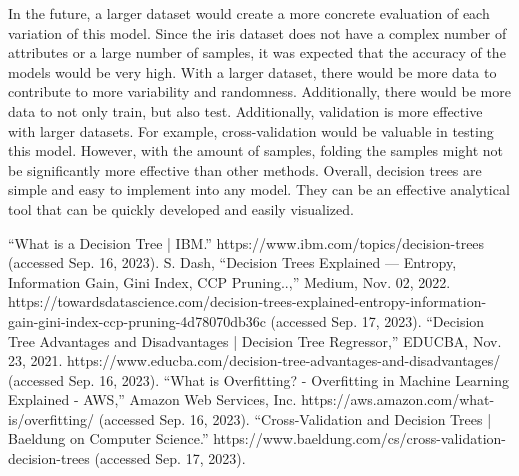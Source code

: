 \documentclass[journal]{IEEEtran}
\begin{document}
In the future, a larger dataset would create a more concrete evaluation of each variation of this model. Since the iris dataset does not have a complex number of attributes or a large number of  samples, it was expected that the accuracy of the models would be very high. With a larger dataset, there would be more data to contribute to more variability and randomness. Additionally, there would be more data to not only train, but also test. Additionally, validation is more effective with larger datasets. For example, cross-validation \cite{b5} would be valuable in testing this model. However, with the amount of samples, folding the samples might not be significantly more effective than other methods. Overall, decision trees are simple and easy to implement into any model. They can be an effective analytical tool that can be quickly developed and easily visualized. 


\begin{thebibliography}{00}
“What is a Decision Tree | IBM.” https://www.ibm.com/topics/decision-trees (accessed Sep. 16, 2023).
S. Dash, “Decision Trees Explained — Entropy, Information Gain, Gini Index, CCP Pruning..,” Medium, Nov. 02, 2022. https://towardsdatascience.com/decision-trees-explained-entropy-information-gain-gini-index-ccp-pruning-4d78070db36c (accessed Sep. 17, 2023).
“Decision Tree Advantages and Disadvantages | Decision Tree Regressor,” EDUCBA, Nov. 23, 2021. https://www.educba.com/decision-tree-advantages-and-disadvantages/ (accessed Sep. 16, 2023).
 “What is Overfitting? - Overfitting in Machine Learning Explained - AWS,” Amazon Web Services, Inc. https://aws.amazon.com/what-is/overfitting/ (accessed Sep. 16, 2023).
 “Cross-Validation and Decision Trees | Baeldung on Computer Science.” https://www.baeldung.com/cs/cross-validation-decision-trees (accessed Sep. 17, 2023).

\end{thebibliography}
\end{document}
